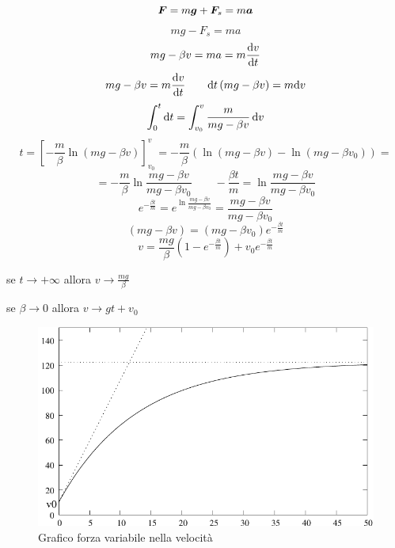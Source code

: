 \begin{equation*}\boldsymbol{F}=m\boldsymbol{g}+\boldsymbol{F}_s=m\boldsymbol{a}\end{equation*}
\begin{equation*}mg-F_s=ma\end{equation*}
\begin{equation*}mg-\beta v=ma=m\frac{\mathrm{d} v}{\mathrm{d} t}\end{equation*}
\begin{equation*}mg-\beta v=m\frac{\mathrm{d} v}{\mathrm{d} t}\qquad \mathrm{d} t\left(mg-\beta v\right)=m\mathrm{d} v\end{equation*}
\begin{equation*}\int_0^t\mathrm{d} t=\int_{v_0}^v\frac{m}{mg-\beta v}\,\mathrm{d} v\end{equation*}
$$t=\left[-\frac{m}{\beta}\ln\left(mg-\beta
v\right)\right]_{v_0}^{v}=-\frac{m}{\beta}\left(\ln\left(mg-\beta
v\right)-\ln\left(mg-\beta v_0\right)\right)=$$
\begin{equation*}=-\frac{m}{\beta}\ln\frac{mg-\beta v}{mg-\beta v_0}\qquad-\frac{\beta t}{m}=\ln\frac{mg-\beta v}{mg-\beta v_0}\end{equation*}
\begin{equation*}e^{-\frac{\beta t}{m}}=e^{\ln\frac{mg-\beta v}{mg-\beta v_0}}=\frac{mg-\beta v}{mg-\beta v_0}\end{equation*}
\begin{equation*}(mg-\beta v)=(mg-\beta v_0)e^{-\frac{\beta t}{m}}\end{equation*}
$$v=\frac{mg}{\beta}\left(1-e^{-\frac{\beta
t}{m}}\right)+v_0e^{-\frac{\beta t}{m}}$$

se $t\rightarrow +\infty$ allora $v\rightarrow\frac{mg}{\beta}$

se $\beta\rightarrow 0$ allora $v\rightarrow gt+v_0$
\begin{figure}[htbp]
\centering
\includegraphics[scale=1]{immagini/fisica1/grafico_forze_nella_velocita}
\caption{Grafico forza variabile nella velocità}
\end{figure}

